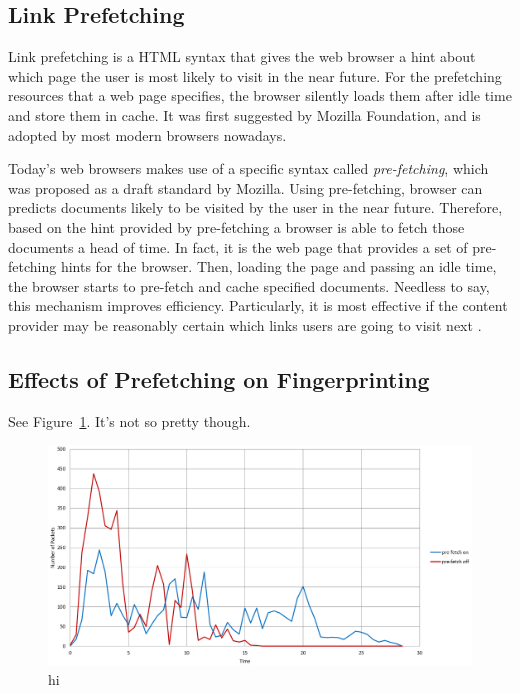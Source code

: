 
\subsection{Link Prefetching}

Link prefetching is a HTML syntax that gives the web browser a hint about which page the user is most likely to visit in the near future.
For the prefetching resources that a web page specifies, the browser silently loads them after idle time and store them in cache. 
It was first suggested by Mozilla Foundation, and is adopted by most modern browsers nowadays.

Today's web browsers makes use of a specific syntax called \emph{pre-fetching}, which was proposed as a draft standard by Mozilla.
Using pre-fetching, browser can predicts documents likely to be visited by the user in the near future.
Therefore, based on the hint provided by pre-fetching a browser is able to fetch those documents a head of time.
In fact, it is the web page that provides a set of pre-fetching hints for the browser.
Then, loading the page and passing an idle time, the browser starts to pre-fetch and cache specified documents.
Needless to say, this mechanism improves efficiency.
Particularly, it is most effective if the content provider may be reasonably certain which links users are going to visit next \cite{wikiPreF}.



\subsection{Effects of Prefetching on Fingerprinting}


See Figure~\ref{fig:prefetch}. It's not so pretty though.
\begin{figure}[h]
\includegraphics[width=\columnwidth]{figures/prefetch.png}
\centering
\caption{hi}
\label{fig:prefetch}
\end{figure}


